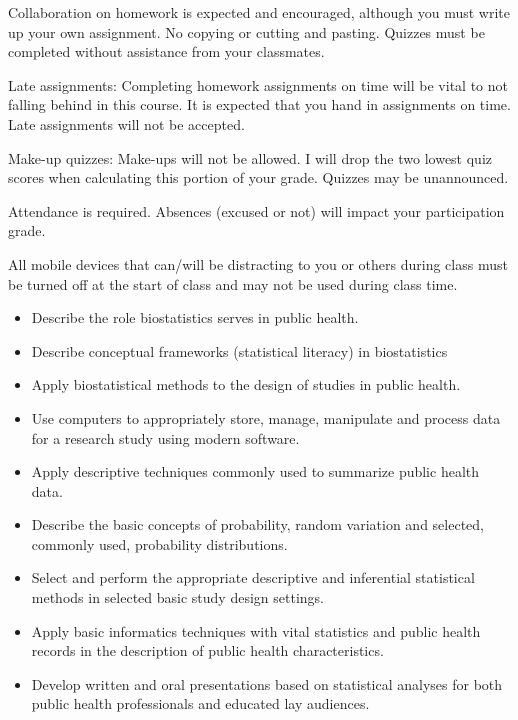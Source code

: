 \documentclass[10pt]{article}
\begin{document}
\bigskip
{}

Collaboration on homework is expected and encouraged, although you must write up your own assignment. No copying or cutting and pasting. Quizzes must be completed without assistance from your classmates. 

Late assignments: Completing homework assignments on time will be vital to not falling behind in this course. It is expected that you hand in assignments on time. Late assignments will not be accepted. 

Make-up quizzes: Make-ups will not be allowed. I will drop the two lowest quiz scores when calculating this portion of your grade. Quizzes may be unannounced.

Attendance is required. Absences (excused or not) will impact your participation grade.

All mobile devices that can/will be distracting to you or others during class must be turned off at the start of class and may not be used during class time.
  
  
  \clearpage
\bigskip
{}
\begin{itemize}
\item Describe the role biostatistics serves in public health.
\item Describe conceptual frameworks (statistical literacy) in biostatistics
\item Apply biostatistical methods to the design of studies in public health.
\item Use computers to appropriately store, manage, manipulate and process data for a research study using modern software.
\item Apply descriptive techniques commonly used to summarize public health data. 
\item Describe the basic concepts of probability, random variation and selected, commonly used, probability distributions.
\item Select and perform the appropriate descriptive and inferential statistical methods in selected basic study design settings.
\item Apply basic informatics techniques with vital statistics and public health records in the description of public health characteristics.
\item Develop written and oral presentations based on statistical analyses for both public health professionals and educated lay audiences.
\end{itemize}
  
\end{document}
